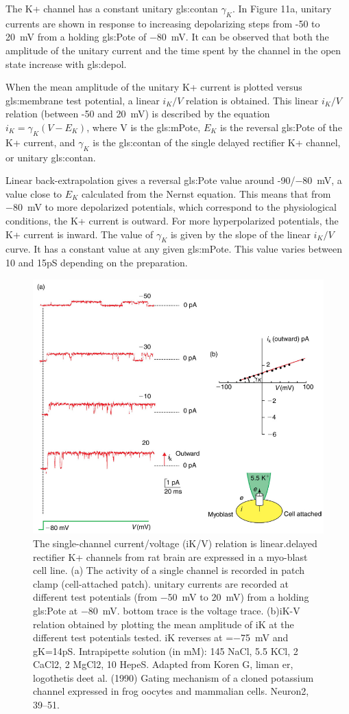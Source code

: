 \documentclass[class={.NoTouch/myProject}, crop=false]{standalone}
\begin{document}
The K+ channel has a constant unitary \gls{gls:contan} \(\gamma_K\). In Figure 11a, unitary currents are shown in response to increasing depolarizing steps from -50 to \qty{20}{\mV} from a holding \gls{gls:Pote} of \qty{-80}{\mV}. It can be observed that both the amplitude of the unitary current and the time spent by the channel in the open state increase with \gls{gls:depol}. 

When the mean amplitude of the unitary K+ current is plotted versus \gls{gls:membrane} test potential, a linear \(i_K/V\) relation is obtained.  This linear \(i_K/V\) relation (between -50 and \qty{20}{\mV}) is described by the equation \(i_K = \gamma_K(V-E_K)\), where V is the \gls{gls:mPote}, \(E_K\) is the reversal \gls{gls:Pote} of the K+ current, and \(\gamma_K\) is the \gls{gls:contan} of the single delayed rectifier K+ channel, or unitary \gls{gls:contan}. 

Linear back-extrapolation gives a reversal \gls{gls:Pote} value around -90/\qty{-80}{\mV}, a value close to \(E_K\) calculated from the Nernst equation. This means that from \qty{-80}{\mV} to more depolarized potentials, which correspond to the physiological conditions, the K+ current is outward. For more hyperpolarized potentials, the K+ current is inward. The value of \(\gamma_K\) is given by the slope of the linear \(i_K/V\)curve. It has a constant value at any given \gls{gls:mPote}. This value varies between 10 and 15pS depending on the preparation. 

\begin{figure}[H]
     \centering
     \includegraphics[width=0.5\linewidth]{Pictures//Anakin/I-V.K.png}
     \caption{The single-channel current/voltage (iK/V) relation is linear.delayed rectifier K+ channels from rat brain are expressed in a myo-blast cell line. (a) The activity of a single channel is recorded in patch clamp (cell-attached patch). unitary currents are recorded at different test potentials (from \qty{-50}{\mV} to \qty{20}{\mV}) from a holding \gls{gls:Pote} at \qty{-80}{\mV}. bottom trace is the voltage trace. (b)iK-V relation obtained by plotting the mean amplitude of iK at the different test potentials tested. iK reverses at =\qty{-75}{\mV} and gK=14pS. Intrapipette solution (in mM): 145 NaCl, 5.5 KCl, 2 CaCl2, 2 MgCl2, 10 HepeS. Adapted from Koren G, liman er, logothetis deet al. (1990) Gating mechanism of a cloned potassium channel expressed in frog oocytes and mammalian cells. Neuron2, 39–51.}
     \label{fig:enter-label}
 \end{figure} 
\end{document}
